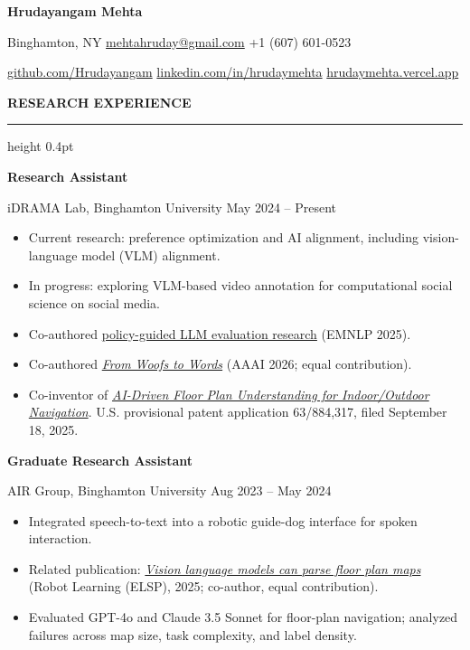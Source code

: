 \documentclass[11pt,letterpaper]{article}
\newcommand{\resumesection}[1]{%
  \par\vspace{9pt}
  {\normalsize\bfseries #1}\par\vspace{3pt}
  \hrule height 0.4pt\vspace{5pt}
}
\newcommand{\role}[3]{%
  \textbf{#1}\par
  #2 \textbar{} #3\par
}
\begin{document}
{\LARGE\bfseries Hrudayangam Mehta}\par\vspace{4pt}
{\small
Binghamton, NY \textbar{}
\href{mailto:mehtahruday@gmail.com}{mehtahruday@gmail.com} \textbar{}
+1 (607) 601-0523\par
\href{https://github.com/Hrudayangam}{github.com/Hrudayangam} \textbar{}
\href{https://www.linkedin.com/in/hrudaymehta/}{linkedin.com/in/hrudaymehta} \textbar{}
\href{https://hrudaymehta.vercel.app/}{hrudaymehta.vercel.app}\par
}

\resumesection{RESEARCH EXPERIENCE}

\role{Research Assistant}{iDRAMA Lab, Binghamton University}{May 2024 -- Present}
\begin{itemize}
  \item Current research: preference optimization and AI alignment, including
    vision-language model (VLM) alignment.
  \item In progress: exploring VLM-based video annotation for computational social science
    on social media.
  \item Co-authored \href{https://aclanthology.org/2025.emnlp-main.1792/}{policy-guided LLM evaluation research}
    (EMNLP 2025).
  \item Co-authored \href{https://ojs.aaai.org/index.php/AAAI/article/view/41198}{\textit{From Woofs to Words}}
    (AAAI 2026; equal contribution).
  \item Co-inventor of \href{https://binghamton.technologypublisher.com/tech?title=AI-Driven_Floor_Plan_Understanding_for_Indoor\%2fOutdoor_Navigation}{\textit{AI-Driven Floor Plan Understanding for Indoor/Outdoor Navigation}}.
    U.S. provisional patent application 63/884,317, filed September 18, 2025.
\end{itemize}

\vspace{3pt}
\role{Graduate Research Assistant}{AIR Group, Binghamton University}{Aug 2023 -- May 2024}
\begin{itemize}
  \item Integrated speech-to-text into a robotic guide-dog interface for spoken interaction.
  \item Related publication: \href{https://www.elspub.com/doi/10.55092/rl20250011}{\textit{Vision language models can parse floor plan maps}}
    (Robot Learning (ELSP), 2025; co-author, equal contribution).
  \item Evaluated GPT-4o and Claude 3.5 Sonnet for floor-plan navigation; analyzed failures
    across map size, task complexity, and label density.
\end{itemize}
\end{document}
